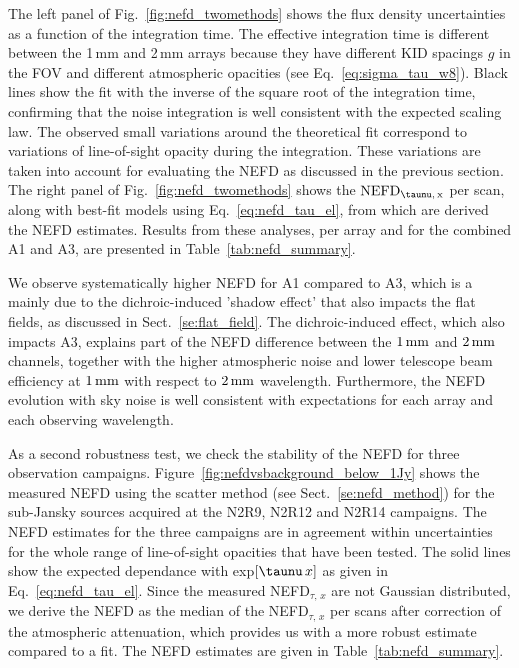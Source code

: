 The left panel of Fig.~\ref{fig:nefd_twomethods} shows the flux density
uncertainties as a function of the integration time. The effective
integration time is different between the 1\,mm and 2\,mm arrays
because they have different KID spacings $g$ in the FOV and different
atmospheric opacities (see Eq.~\ref{eq:sigma_tau_w8}). Black lines show
the fit with the inverse of the square root of the integration time,
confirming that the noise integration is well consistent with the expected
scaling law. The observed small variations around the theoretical fit
correspond to variations of line-of-sight opacity during the
integration. These variations are taken into account for evaluating the NEFD as
discussed in the previous section. The right panel of
Fig.~\ref{fig:nefd_twomethods} shows the
$\rm{NEFD}_{\taunu,\, x}$ per scan, along with best-fit models using
Eq.~\ref{eq:nefd_tau_el}, from which are derived the \rm{NEFD} estimates. 
Results from these analyses, per array and for the
combined A1 and A3, are presented in Table~\ref{tab:nefd_summary}.

We observe systematically higher NEFD for A1 compared to A3, which is a mainly
due to the dichroic-induced 'shadow effect' that also impacts the flat fields,
as discussed in Sect.~\ref{se:flat_field}.  The dichroic-induced effect, which
also impacts A3, explains part of the NEFD difference between the $1\, \rm{mm}$
and $2\, \rm{mm}$ channels, together with the higher atmospheric noise and lower
telescope beam efficiency at $1\, \rm{mm}$ with respect to $2\,\rm{mm}$
wavelength.  Furthermore, the NEFD evolution with sky noise is well
consistent with expectations for each array and each observing wavelength.

As a second robustness test, we check the stability of the NEFD for
three observation campaigns. Figure~\ref{fig:nefdvsbackground_below_1Jy} shows the
measured NEFD using the scatter method (see Sect.~\ref{se:nefd_method}) for the
sub-Jansky sources acquired at the N2R9, N2R12 and N2R14
campaigns. The NEFD estimates for the
three campaigns are in agreement within uncertainties for the whole
range of line-of-sight opacities that have been tested.
The solid lines show the expected dependance with
exp${[\taunu\,x]}$ as given in Eq.~\ref{eq:nefd_tau_el}. %
Since the measured NEFD$_{\tau,\, x}$ are not Gaussian distributed, we
derive the NEFD as the median of the NEFD$_{\tau,\, x}$
per scans after correction of the atmospheric attenuation, which provides us
with a more robust estimate compared to a fit. The NEFD estimates
are given in Table~\ref{tab:nefd_summary}.

